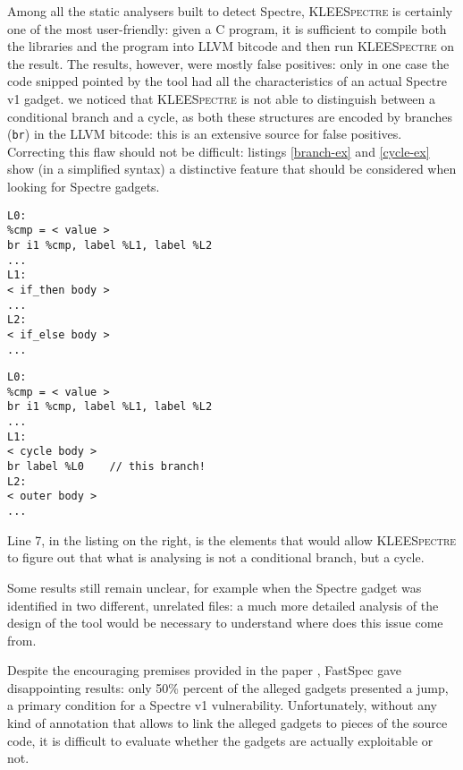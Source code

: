 \documentclass[12pt,a4paper]{book}
\theoremstyle{definition}
\begin{document}
	Among all the static analysers built to detect Spectre, \textsc{KLEESpectre} is certainly one of the most user-friendly: given a C program, it is sufficient to compile both the libraries and the program into LLVM bitcode and then run \textsc{KLEESpectre} on the result. The results, however, were mostly false positives: only in one case the code snipped pointed by the tool had all the characteristics of an actual Spectre v1 gadget. we noticed that \textsc{KLEESpectre} is not able to distinguish between a conditional branch and a cycle, as both these structures are encoded by branches (\texttt{br}) in the LLVM bitcode: this is an extensive source for false positives. Correcting this flaw should not be difficult: listings \ref{branch-ex} and \ref{cycle-ex} show (in a simplified syntax) a distinctive feature that should be considered when looking for Spectre gadgets.
	
	\begin{minipage}{0.45\textwidth}
		\begin{lstlisting}[basicstyle=\scriptsize\ttfamily, caption={\small LLVM bitcode fragment a conditional branch\vspace{2mm}}, label=branch-ex]
L0:	
%cmp = < value >
br i1 %cmp, label %L1, label %L2
...
L1:
< if_then body >
...
L2:
< if_else body >
...
		\end{lstlisting}
	\end{minipage}\hfill
	\begin{minipage}{0.45\textwidth}
		\begin{lstlisting}[basicstyle=\scriptsize\ttfamily, caption={\small LLVM bitcode fragment encoding a cycle\vspace{2mm}}, numbers=right, label=cycle-ex]
L0:
%cmp = < value >
br i1 %cmp, label %L1, label %L2
...
L1:
< cycle body >
br label %L0	// this branch!
L2:
< outer body >
...
		\end{lstlisting}
	\end{minipage}
	\vspace{3mm}
	
	Line 7, in the listing on the right, is the elements that would allow \textsc{KLEESpectre} to figure out that what is analysing is not a conditional branch, but a cycle.
	
	Some results still remain unclear, for example when the Spectre gadget was identified in two different, unrelated files: a much more detailed analysis of the design of the tool would be necessary to understand where does this issue come from.
	
	Despite the encouraging premises provided in the paper \cite{Tol2021}, FastSpec gave disappointing results: only 50\% percent of the alleged gadgets presented a jump, a primary condition for a Spectre v1 vulnerability. Unfortunately, without any kind of annotation that allows to link the alleged gadgets to pieces of the source code, it is difficult to evaluate whether the gadgets are actually exploitable or not.
	
\end{document}
